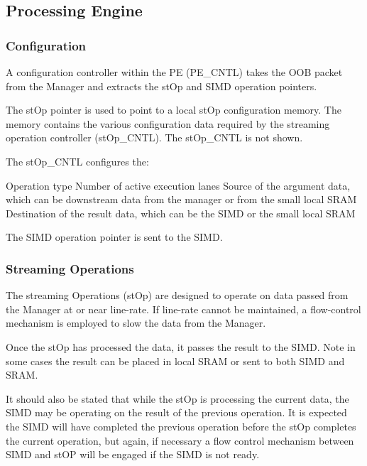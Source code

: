\documentclass[journal]{IEEEtran}
\begin{document}
\subsection{Processing Engine}
\label{sec:pe}

\subsubsection{Configuration}
\label{ssec:peConfiguration}

A configuration controller within the PE (PE\_CNTL) takes the OOB packet from the Manager and extracts the stOp and SIMD operation pointers.

The stOp pointer is used to point to a local stOp configuration memory. The memory contains the various configuration data required by the streaming operation controller (stOp\_CNTL). The stOp\_CNTL is not shown.

The stOp\_CNTL configures the:

\begin{outline}
    \1 Operation type
    \1 Number of active execution lanes
    \1 Source of the argument data, which can be downstream data from the manager or from the small local SRAM
    \1 Destination of the result data, which can be the SIMD or the small local SRAM
\end{outline}

The SIMD operation pointer is sent to the SIMD.

\subsubsection{Streaming Operations}
\label{ssec:stOps}

The streaming Operations (stOp) are designed to operate on data passed from the Manager at or near line-rate. If line-rate cannot be maintained, a flow-control mechanism is employed to slow the data from the Manager.

Once the stOp has processed the data, it passes the result to the SIMD. Note in some cases the result can be placed in local SRAM or sent to both SIMD and SRAM.

It should also be stated that while the stOp is processing the current data, the SIMD may be operating on the result of the previous operation. It is expected the SIMD will have completed the previous operation before the stOp completes the current operation, but again, if necessary a flow control mechanism between SIMD and stOP will be engaged if the SIMD is not ready.
\end{document}
